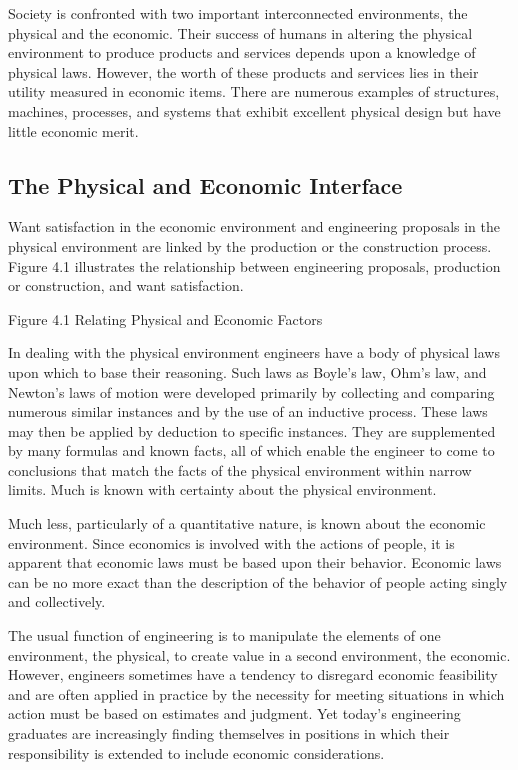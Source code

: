 Society is confronted with two important interconnected environments, the physical and the economic. Their success of humans in altering the physical environment to produce products and services depends upon a knowledge of physical laws. However, the worth of these products and services lies in their utility measured in economic items. There are numerous examples of structures, machines, processes, and systems that exhibit excellent physical design but have little economic merit.

\subsection{The Physical and Economic Interface}

Want satisfaction in the economic environment and engineering proposals in the physical environment are linked by the production or the construction process. Figure 4.1 illustrates the relationship between engineering proposals, production or construction, and want satisfaction.

Figure 4.1 Relating Physical and Economic Factors

In dealing with the physical environment engineers have a body of physical laws upon which to base their reasoning. Such laws as Boyle’s law, Ohm’s law, and Newton’s laws of motion were developed primarily by collecting and comparing numerous similar instances and by the use of an inductive process. These laws may then be applied by deduction to specific instances. They are supplemented by many formulas and known facts, all of which enable the engineer to come to conclusions that match the facts of the physical environment within narrow limits. Much is known with certainty about the physical environment.

Much less, particularly of a quantitative nature, is known about the economic environment. Since economics is involved with the actions of people, it is apparent that economic laws must be based upon their behavior. Economic laws can be no more exact than the description of the behavior of people acting singly and collectively.

The usual function of engineering is to manipulate the elements of one environment, the physical, to create value in a second environment, the economic. However, engineers sometimes have a tendency to disregard economic feasibility and are often applied in practice by the necessity for meeting situations in which action must be based on estimates and judgment. Yet today’s engineering graduates are increasingly finding themselves in positions in which their responsibility is extended to include economic considerations.

